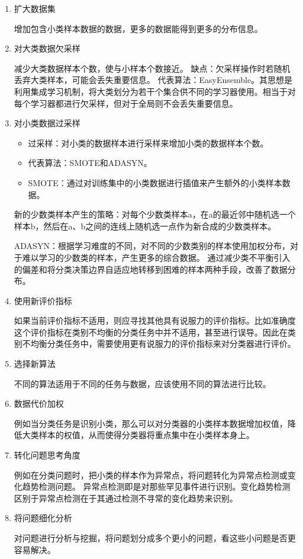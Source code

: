 \begin{enumerate}\itemsep0em 
		\item 扩大数据集

			增加包含小类样本数据的数据，更多的数据能得到更多的分布信息。

		\item 对大类数据欠采样

			减少大类数据样本个数，使与小样本个数接近。
		缺点：欠采样操作时若随机丢弃大类样本，可能会丢失重要信息。 
		代表算法：EasyEnsemble。其思想是利用集成学习机制，将大类划分为若干个集合供不同的学习器使用。相当于对每个学习器都进行欠采样，但对于全局则不会丢失重要信息。

	\item 对小类数据过采样

	\begin{itemize}\itemsep0em 
			\item 过采样：对小类的数据样本进行采样来增加小类的数据样本个数。 
			\item 代表算法：SMOTE和ADASYN。 
			\item SMOTE：通过对训练集中的小类数据进行插值来产生额外的小类样本数据。
	\end{itemize}

		新的少数类样本产生的策略：对每个少数类样本a，在a的最近邻中随机选一个样本b，然后在a、b之间的连线上随机选一点作为新合成的少数类样本。 	

		ADASYN：根据学习难度的不同，对不同的少数类别的样本使用加权分布，对于难以学习的少数类的样本，产生更多的综合数据。 通过减少类不平衡引入的偏差和将分类决策边界自适应地转移到困难的样本两种手段，改善了数据分布。

	\item 使用新评价指标

		如果当前评价指标不适用，则应寻找其他具有说服力的评价指标。比如准确度这个评价指标在类别不均衡的分类任务中并不适用，甚至进行误导。因此在类别不均衡分类任务中，需要使用更有说服力的评价指标来对分类器进行评价。

	\item 选择新算法

		不同的算法适用于不同的任务与数据，应该使用不同的算法进行比较。

	\item 数据代价加权

		例如当分类任务是识别小类，那么可以对分类器的小类样本数据增加权值，降低大类样本的权值，从而使得分类器将重点集中在小类样本身上。

	\item 转化问题思考角度

		例如在分类问题时，把小类的样本作为异常点，将问题转化为异常点检测或变化趋势检测问题。 异常点检测即是对那些罕见事件进行识别。变化趋势检测区别于异常点检测在于其通过检测不寻常的变化趋势来识别。	

	\item 将问题细化分析

		对问题进行分析与挖掘，将问题划分成多个更小的问题，看这些小问题是否更容易解决。 
\end{enumerate}


